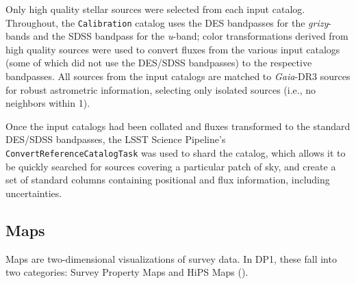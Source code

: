 \begin{itemize}
Only high quality stellar sources were selected from each input catalog. Throughout, the \texttt{Calibration} catalog uses the \gls{DES} bandpasses for the \textit{grizy}-bands and the \gls{SDSS} bandpass for the \textit{u}-band; color transformations derived from high quality sources were used to convert fluxes from the various input catalogs (some of which did not use the \gls{DES}/SDSS bandpasses) to the respective bandpasses. All sources from the input catalogs are matched to \textit{Gaia}-\gls{DR3} sources for robust astrometric information, selecting only isolated sources (i.e., no neighbors within 1\arcsec).

Once the input catalogs had been collated and fluxes transformed to the standard \gls{DES}/\gls{SDSS} bandpasses, the \gls{LSST} Science Pipeline's \texttt{ConvertReferenceCatalogTask} was used to shard the catalog, which allows it to be quickly searched for sources covering a particular \gls{patch} of sky, and create a set of standard columns containing positional and \gls{flux} information, including uncertainties.


\end{itemize}





\subsection{Maps}
Maps are two-dimensional visualizations of survey data. In \gls{DP1}, these fall into two categories: Survey Property Maps and \gls{HiPS} Maps (\citealt{2015A&A...578A.114F}).

